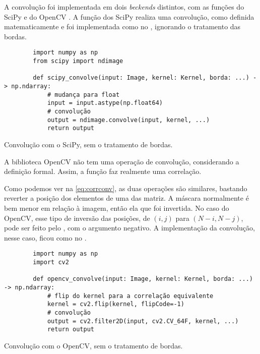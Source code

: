 A convolução foi implementada em dois \textit{beckends} distintos, com as funções  do SciPy \autocite{ref:ndimage} e  do OpenCV \autocite{ref:cvfilter}. A função dos SciPy realiza uma convolução, como definida matematicamente e foi implementada como no , ignorando o tratamento das bordas.

\begin{listing}[H]
    \begin{verbatim}
        import numpy as np
        from scipy import ndimage

        def scipy_convolve(input: Image, kernel: Kernel, borda: ...) -> np.ndarray:
            # mudança para float
            input = input.astype(np.float64)
            # convolução
            output = ndimage.convolve(input, kernel, ...)
            return output
    \end{verbatim}

    \caption{Convolução com o SciPy, sem o tratamento de bordas.}
    \label{code:scipy}
\end{listing}

A biblioteca OpenCV não tem uma operação de convolução, considerando a definição formal. Assim, a função  faz realmente uma correlação.

Como podemos ver na \cref{eq:corrconv}, as duas operações são similares, bastando reverter a posição dos elementos de uma das matriz. A máscara normalmente é bem menor em relação à imagem, então ela que foi invertida. No caso do OpenCV, esse tipo de inversão das posições, de $(i, j)$ para $(N-i, N-j)$, pode ser feito pelo  \autocite{ref:cvflip}, com o argumento  negativo. A implementação da convolução, nesse caso, ficou como no .

\begin{listing}[H]
    \begin{verbatim}
        import numpy as np
        import cv2

        def opencv_convolve(input: Image, kernel: Kernel, borda: ...) -> np.ndarray:
            # flip do kernel para a correlação equivalente
            kernel = cv2.flip(kernel, flipCode=-1)
            # convolução
            output = cv2.filter2D(input, cv2.CV_64F, kernel, ...)
            return output
    \end{verbatim}

    \caption{Convolução com o OpenCV, sem o tratamento de bordas.}
    \label{code:opencv}
\end{listing}

